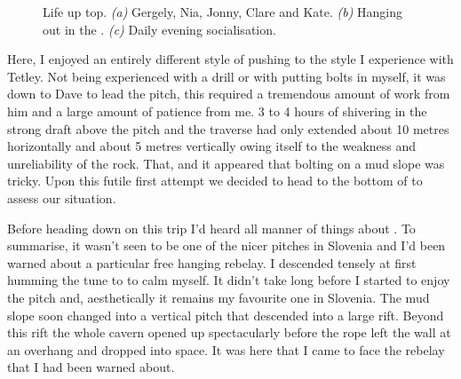 \begin{figure}[t!]
        \begin{subfigure}[t]{\textwidth}
            \centering
            \caption{} \label{cloudy sunset}
        \end{subfigure}
        
        \caption{Life up top. \textit{(a)} Gergely, Nia, Jonny, Clare and Kate.
            \textit{(b)} Hanging out in the \protect{}. 
            \textit{(c)} Daily evening socialisation. 
        }
    \end{figure}

Here, I enjoyed an entirely different style of pushing to the style I
experience with Tetley. Not being experienced with a drill or with
putting bolts in myself, it was down to Dave to lead the pitch, this
required a tremendous amount of work from him and a large amount of
patience from me. 3 to 4 hours of shivering in the strong draft above
the pitch and the traverse had only extended about 10 metres
horizontally and about 5 metres vertically owing itself to the weakness
and unreliability of the rock. That, and it appeared that bolting on a
mud slope was tricky. Upon this futile first attempt we decided to head
to the bottom of  to assess our situation.

Before heading down on this trip I'd heard all manner of things about
. To summarise, it wasn't seen to be one
of the nicer pitches in Slovenia and I'd been warned about a particular
free hanging rebelay. I descended tensely at first humming the tune to
 to calm myself. It didn't take long
before I started to enjoy the pitch and, aesthetically it remains my
favourite one in Slovenia. The mud slope soon changed into a vertical
pitch that descended into a large rift. Beyond this rift the whole
cavern opened up spectacularly before the rope left the wall at an
overhang and dropped into space. It was here that I came to face the
rebelay that I had been warned about.

